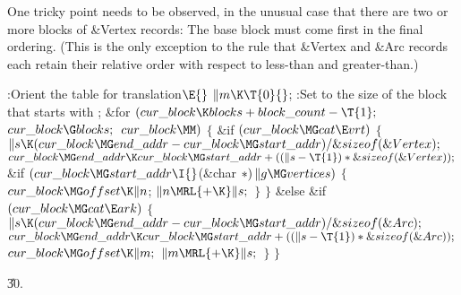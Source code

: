 One tricky point needs to be observed, in the unusual case that
there are two or more blocks of \&{Vertex} records: The base block
 must come first in the final ordering. (This is the
only
exception to the rule that \&{Vertex} and \&{Arc} records each retain
their relative order with respect to less-than and greater-than.)

\Y\B\4:Orient the  table for translation\X${}\E{}$\6
$\|m\K\T{0}{}$;\5
:Set  to the size of the block that starts with \X;\6
\&{for} ${}(\\{cur\_block}\K\\{blocks}+\\{block\_count}-\T{1};{}$ ${}\\{cur%
\_block}\G\\{blocks};{}$ ${}\\{cur\_block}\MM){}$\5
${}\{{}$\1\6
\&{if} ${}(\\{cur\_block}\MG\\{cat}\E\\{vrt}){}$\5
${}\{{}$\1\6
${}\|s\K(\\{cur\_block}\MG\\{end\_addr}-\\{cur\_block}\MG\\{start\_addr})/%
\&{sizeof}(\&{Vertex});{}$\6
${}\\{cur\_block}\MG\\{end\_addr}\K\\{cur\_block}\MG\\{start\_addr}+((\|s-%
\T{1})*\&{sizeof}(\&{Vertex}));{}$\6
\&{if} ${}(\\{cur\_block}\MG\\{start\_addr}\I{}$(\&{char} ${}{*})\,\|g\MG%
\\{vertices}){}$\5
${}\{{}$\1\6
${}\\{cur\_block}\MG\\{offset}\K\|n{}$;\5
${}\|n\MRL{+{\K}}\|s;{}$\6
\4${}\}{}$\2\6
\4${}\}{}$\5
\2\&{else} \&{if} ${}(\\{cur\_block}\MG\\{cat}\E\\{ark}){}$\5
${}\{{}$\1\6
${}\|s\K(\\{cur\_block}\MG\\{end\_addr}-\\{cur\_block}\MG\\{start\_addr})/%
\&{sizeof}(\&{Arc});{}$\6
${}\\{cur\_block}\MG\\{end\_addr}\K\\{cur\_block}\MG\\{start\_addr}+((\|s-%
\T{1})*\&{sizeof}(\&{Arc}));{}$\6
${}\\{cur\_block}\MG\\{offset}\K\|m;{}$\6
${}\|m\MRL{+{\K}}\|s;{}$\6
\4${}\}{}$\2\6
\4${}\}{}$\2\par
\U30.\fi

